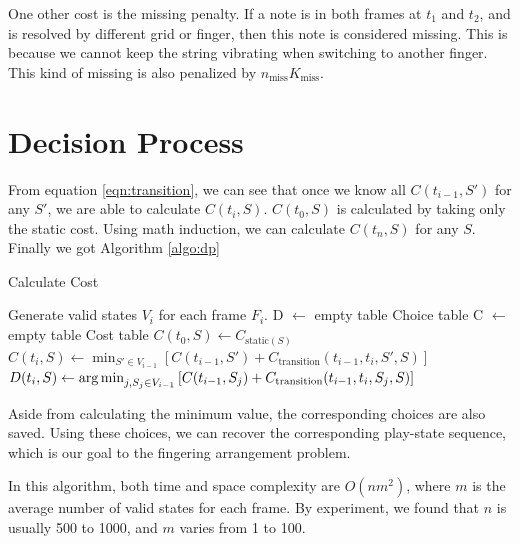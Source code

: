 One other cost is the missing penalty. If a note is in both frames at $t_1$ and $t_2$, and is resolved by different grid or finger, then this note is considered missing. This is because we cannot keep the string vibrating when switching to another finger. This kind of missing is also penalized by
$n_\mathrm{miss} K_\mathrm{miss}$.


\section{Decision Process}

From equation \ref{eqn:transition}, we can see that once we know all $C(t_{i-1}, S')$ for any 
$S'$, we are able to calculate $C(t_i, S)$. $C(t_0, S)$ is calculated by taking only the static cost.
Using math induction, we can calculate $C(t_n, S)$ for any $S$. Finally we got Algorithm \ref{algo:dp}

\begin{algorithm}
    \caption{Calculate Cost} \label{algo:dp}
    \begin{algorithmic}
        \State {}
        \State Generate valid states $V_i$ for each frame $F_i$.
        \State D $\gets$ empty table \Comment Choice table
        \State C $\gets$ empty table \Comment Cost table
            \State $C(t_0, S) \gets C_{\mathrm{static}(S)}$
        \EndFor
                \State $C(t_i, S) \gets \min_{S' \in V_{i-1}} \left[
                        C(t_{i-1}, S') + C_{\mathrm{transition}}(t_{i-1}, t_i, S', S)
                    \right] $
                \State $D(t_i, S) \gets \operatorname*{arg\,min}_{j, S_j \in V_{i-1}} \left[
                        C(t_{i-1}, S_j) + C_{\mathrm{transition}}(t_{i-1}, t_i, S_j, S)
                    \right] $
            \EndFor
        \EndFor
    \EndProcedure
    \end{algorithmic}
\end{algorithm}

Aside from calculating the minimum value, the corresponding choices are also saved. Using these choices, we can recover the corresponding play-state sequence, which is our goal to the fingering arrangement problem.

In this algorithm, both time and space complexity are $O(nm^2)$, where $m$ is the average number of
valid states for each frame. By experiment, we found that $n$ is usually 500 to 1000, and $m$ varies from 1 to 100.

